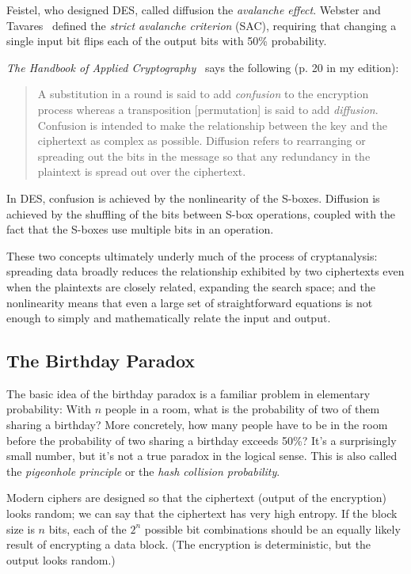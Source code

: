 Feistel, who designed DES, called diffusion the \emph{avalanche
  effect}.  Webster and Tavares~\cite{webster86:avalanche} defined the
\emph{strict avalanche criterion} (SAC), requiring that changing a
single input bit flips each of the output bits with 50\% probability.

\emph{The Handbook of Applied Cryptography}~\cite{menezes1996handbook}
says the following (p. 20 in my edition):

\begin{quote}
A substitution in a round is said to add \emph{confusion} to the
encryption process whereas a transposition [permutation] is said to
add \emph{diffusion}. Confusion is intended to make the relationship
between the key and the ciphertext as complex as possible.  Diffusion
refers to rearranging or spreading out the bits in the message so that
any redundancy in the plaintext is spread out over the ciphertext.
\end{quote}

\aonolook{} In DES, confusion is achieved by the nonlinearity of the
S-boxes.  Diffusion is achieved by the shuffling of the bits between
S-box operations, coupled with the fact that the S-boxes use multiple
bits in an operation.

These two concepts ultimately underly much of the process of
cryptanalysis: spreading data broadly reduces the relationship
exhibited by two ciphertexts even when the plaintexts are closely
related, expanding the search space; and the nonlinearity means that
even a large set of straightforward equations is not enough to simply
and mathematically relate the input and output.

\subsection{The Birthday Paradox}
\label{sec:birthday}

The basic idea of the birthday paradox is a familiar problem in
elementary probability:
With $n$ people in a room, what is the probability of two of
them sharing a birthday?  More concretely, how many people have to be
in the room before the probability of two sharing a birthday exceeds
50\%?  It's a surprisingly small number, but it's not a true paradox in
the logical sense.  This is also called the \emph{pigeonhole principle} or
the \emph{hash collision probability}.

Modern ciphers are designed so that the ciphertext (output of the
encryption) looks random; we can say that the ciphertext has very high
entropy.  If the block size is $n$ bits, each of the $2^n$ possible
bit combinations should be an equally likely result of encrypting a
data block.  (The encryption is deterministic, but the output looks
random.)

